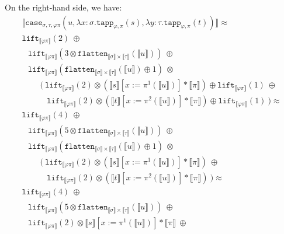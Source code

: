 \documentclass[a4paper,UKenglish,cleveref,autoref,numberwithinsect]{lipics-v2019}
\theoremstyle{definition}
\newcommand{\abs}[2]{\lambda #1.#2}
\newcommand{\flatten}{\mathtt{flatten}}
\newcommand{\lift}{\mathtt{lift}}
\newcommand{\typeinterpret}[1]{\llbracket #1 \rrbracket}
\newcommand{\interpret}[1]{\llbracket #1 \rrbracket}
\begin{document}
\begin{itemize}
  On the right-hand side, we have:
  \[
  \begin{array}{l}
  \interpret{\mathtt{case}_{\sigma,\tau,\varphi\pi}(u,
    \abs{x:\sigma}{\mathtt{tapp}_{\varphi,\pi}(s)},
    \abs{y:\tau}{\mathtt{tapp}_{\varphi,\pi}(t)})} \approx \\
  \lift_{\typeinterpret{\varphi\pi}}(2)\ \oplus \\
  \phantom{A}
  \lift_{\typeinterpret{\varphi\pi}}(3 \otimes \flatten_{
    \typeinterpret{\sigma} \times \typeinterpret{\tau}}(
    \interpret{u}))\ \oplus \\
  \phantom{A}
  \lift_{\typeinterpret{\varphi\pi}}(\flatten_{\typeinterpret{\sigma}
    \times \typeinterpret{\tau}}(\interpret{u}) \oplus 1)\ \otimes \\
  \phantom{ABC}(\ 
    \lift_{\typeinterpret{\varphi\pi}}(2) \otimes
    (\typeinterpret{s}[x:=\pi^1(\interpret{u})]
      * \typeinterpret{\pi}) \oplus
    \lift_{\typeinterpret{\varphi\pi}}(1)\ \oplus \\
  \phantom{ABCD}
    \lift_{\typeinterpret{\varphi\pi}}(2) \otimes
    (\typeinterpret{t}[x:=\pi^2(\interpret{u})]
      * \typeinterpret{\pi}) \oplus
    \lift_{\typeinterpret{\varphi\pi}}(1)
  \ ) \approx \\
  \lift_{\typeinterpret{\varphi\pi}}(4)\ \oplus \\
  \phantom{A}
  \lift_{\typeinterpret{\varphi\pi}}(5 \otimes \flatten_{
    \typeinterpret{\sigma} \times \typeinterpret{\tau}}(
    \interpret{u}))\ \oplus \\
  \phantom{A}
  \lift_{\typeinterpret{\varphi\pi}}(\flatten_{\typeinterpret{\sigma}
    \times \typeinterpret{\tau}}(\interpret{u}) \oplus 1)\ \otimes \\
  \phantom{ABC}(\ 
    \lift_{\typeinterpret{\varphi\pi}}(2) \otimes
    (\typeinterpret{s}[x:=\pi^1(\interpret{u})]
      * \typeinterpret{\pi})\ \oplus \\
  \phantom{ABCD}
    \lift_{\typeinterpret{\varphi\pi}}(2) \otimes
    (\typeinterpret{t}[x:=\pi^2(\interpret{u})]
      * \typeinterpret{\pi})
  \ ) \approx \\
  \lift_{\typeinterpret{\varphi\pi}}(4)\ \oplus \\
  \phantom{A}
  \lift_{\typeinterpret{\varphi\pi}}(5 \otimes \flatten_{
    \typeinterpret{\sigma} \times \typeinterpret{\tau}}(
    \interpret{u}))\ \oplus \\
  \phantom{A}
  \lift_{\typeinterpret{\varphi\pi}}(2) \otimes
    \interpret{s}[x:=\pi^1(\interpret{u})] * \typeinterpret{\pi}\ \oplus\\

\end{array}\]
\end{itemize}
\end{document}
